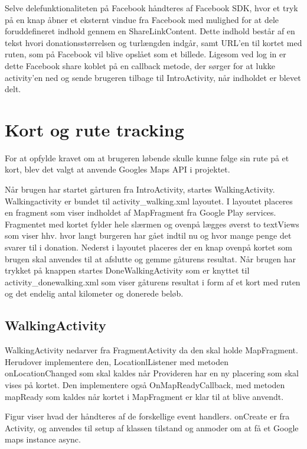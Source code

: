 Selve delefunktionaliteten på Facebook håndteres af Facebook SDK, hvor et tryk på en knap åbner et eksternt vindue fra Facebook med mulighed for at dele foruddefineret indhold gennem en ShareLinkContent. Dette indhold består af en tekst hvori donationsstørrelsen og turlængden indgår, samt URL’en til kortet med ruten, som på Facebook vil blive opslået som et billede. Ligesom ved log in er dette Facebook share koblet på en callback metode, der sørger for at lukke activity’en ned og sende brugeren tilbage til IntroActivity, når indholdet er blevet delt.

\section{Kort og rute tracking}
For at opfylde kravet om at brugeren løbende skulle kunne følge sin rute på et kort, blev det valgt at anvende Googles Maps API i projektet.

Når brugen har startet gårturen fra IntroActivity, startes WalkingActivity. Walkingactivity er bundet til activity\_walking.xml layoutet. I layoutet placeres en fragment som viser indholdet af MapFragment fra Google Play services. Fragmentet med kortet fylder hele slærmen og ovenpå lægges øverst to textViews som viser hhv. hvor langt burgeren har gået indtil nu og hvor mange penge det svarer til i donation.
Nederst i layoutet placeres der en knap ovenpå kortet som brugen skal anvendes til at afslutte og gemme gåturens resultat. Når brugen har trykket på knappen startes DoneWalkingActivity som er knyttet til activity\_donewalking.xml som viser gåturens resultat i form af et kort med ruten og det endelig antal kilometer og donerede beløb.

\subsection{WalkingActivity}

WalkingActivity nedarver fra FragmentActivity da den skal holde MapFragment. Herudover implementere den, LocationlListener med metoden onLocationChanged som skal kaldes når Provideren har en ny placering som skal vises på kortet. Den implementere også OnMapReadyCallback, med metoden mapReady som kaldes når kortet i MapFragment er klar til at blive anvendt.

Figur  viser hvad der håndteres af de forskellige event handlers. onCreate er fra Activity, og anvendes til setup af klassen tilstand og anmoder om at få et Google maps instance async.

